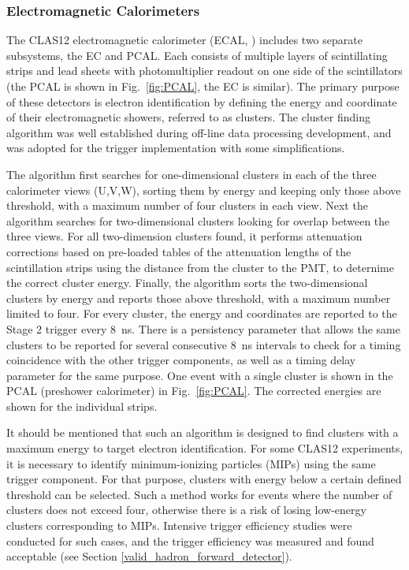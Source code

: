 \subsubsection{Electromagnetic Calorimeters}
\label{sec:ECAL}

The CLAS12 electromagnetic calorimeter (ECAL, \cite{ec-ref}) includes two separate subsystems, the EC and PCAL. Each consists of multiple layers of scintillating strips and lead sheets with photomultiplier readout on one side of the scintillators (the PCAL is shown in Fig.~\ref{fig:PCAL}, the EC is similar). The primary purpose of these detectors is electron identification by defining the energy and coordinate of their electromagnetic showers, referred to as clusters. The cluster finding algorithm was well established during off-line data processing development, and was adopted for the trigger implementation with some simplifications.

The algorithm first searches for one-dimensional clusters in each of the three calorimeter views (U,V,W), sorting them by energy and keeping only those above threshold, with a maximum number of four clusters in each view. Next the algorithm searches for two-dimensional clusters looking for overlap between the three views. For all two-dimension clusters found, it performs attenuation corrections based on pre-loaded tables of the attenuation lengths of the scintillation strips using the distance from the cluster to the PMT, to deternime the correct cluster energy. Finally, the algorithm sorts the two-dimensional clusters by energy and reports those above threshold, with a maximum number limited to four. For every cluster, the energy and coordinates are reported to the Stage 2 trigger every 8~ns. There is a persistency parameter that allows the same clusters to be reported for several consecutive 8~ns intervals to check for a timing coincidence with the other trigger components, as well as a timing delay parameter for the same purpose. One event with a single cluster is shown in the PCAL (preshower calorimeter) in Fig.~\ref{fig:PCAL}. The corrected energies are shown for the individual strips.

It should be mentioned that such an algorithm is designed to find clusters with a maximum energy to target electron identification. For some CLAS12 experiments, it is necessary to identify minimum-ionizing particles (MIPs) using the same trigger component. For that purpose, clusters with energy below a certain defined threshold can be selected. Such a method works for events where the number of clusters does not exceed four, otherwise there is a risk of losing low-energy clusters corresponding to MIPs. Intensive trigger efficiency studies were conducted for such cases, and the trigger efficiency was measured and found acceptable (see Section \ref{valid_hadron_forward_detector}).

